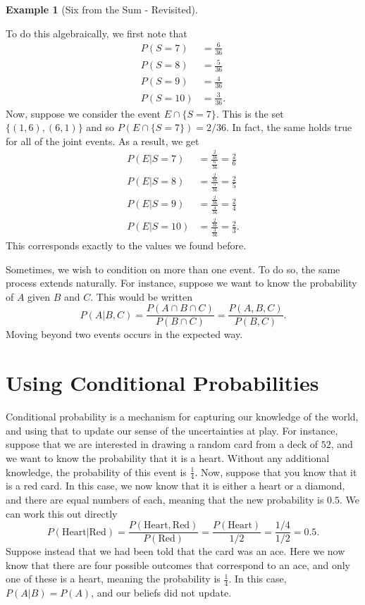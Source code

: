 \documentclass[
  letterpaper,
  DIV=11,
  numbers=noendperiod]{scrreprt}
\theoremstyle{definition}
\theoremstyle{definition}
\newtheorem{example}{Example}[chapter]
\theoremstyle{definition}
\theoremstyle{remark}
\begin{document}
\begin{example}[Six from the Sum -
Revisited]
\begin{tcolorbox}[enhanced jigsaw, colback=white, colframe=quarto-callout-color-frame, arc=.35mm, leftrule=.75mm, rightrule=.15mm, opacityback=0, breakable, bottomrule=.15mm, left=2mm, toprule=.15mm]
To do this algebraically, we first note that \begin{align*}
    P(S=7) &= \frac{6}{36} \\
    P(S=8) &= \frac{5}{36} \\
    P(S=9) &= \frac{4}{36} \\
    P(S=10) &= \frac{3}{36}.
\end{align*} Now, suppose we consider the event \(E\cap\{S=7\}\). This
is the set \(\{(1,6),(6,1)\}\) and so \(P(E\cap\{S=7\}) = 2/36\). In
fact, the same holds true for all of the joint events. As a result, we
get \begin{align*}
    P(E|S=7) &= \frac{\frac{2}{36}}{\frac{6}{36}} = \frac{2}{6} \\
    P(E|S=8) &= \frac{\frac{2}{36}}{\frac{5}{36}} = \frac{2}{5} \\
    P(E|S=9) &= \frac{\frac{2}{36}}{\frac{4}{36}} = \frac{2}{4} \\
    P(E|S=10) &= \frac{\frac{2}{36}}{\frac{3}{36}} = \frac{2}{3}.
\end{align*} This corresponds exactly to the values we found before.

\end{tcolorbox}

\end{example}

Sometimes, we wish to condition on more than one event. To do so, the
same process extends naturally. For instance, suppose we want to know
the probability of \(A\) given \(B\) and \(C\). This would be written
\[P(A|B,C) = \frac{P(A\cap B\cap C)}{P(B \cap C)} = \frac{P(A,B,C)}{P(B,C)}.\]
Moving beyond two events occurs in the expected way.

\section{Using Conditional
Probabilities}\label{using-conditional-probabilities}

Conditional probability is a mechanism for capturing our knowledge of
the world, and using that to update our sense of the uncertainties at
play. For instance, suppose that we are interested in drawing a random
card from a deck of \(52\), and we want to know the probability that it
is a heart. Without any additional knowledge, the probability of this
event is \(\frac{1}{4}\). Now, suppose that you know that it is a red
card. In this case, we now know that it is either a heart or a diamond,
and there are equal numbers of each, meaning that the new probability is
\(0.5\). We can work this out directly
\[P(\text{Heart}|\text{Red}) = \frac{P(\text{Heart},\text{Red})}{P(\text{Red})} = \frac{P(\text{Heart})}{1/2} = \frac{1/4}{1/2} = 0.5.\]
Suppose instead that we had been told that the card was an ace. Here we
now know that there are four possible outcomes that correspond to an
ace, and only one of these is a heart, meaning the probability is
\(\frac{1}{4}\). In this case, \(P(A|B) = P(A)\), and our beliefs did
not update.
\end{document}
